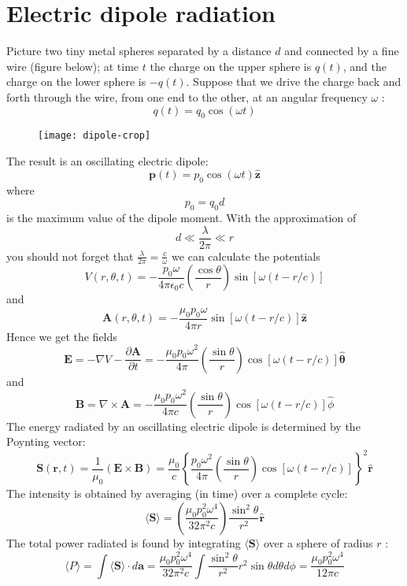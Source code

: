  \section{Electric dipole radiation}
 Picture two tiny metal spheres separated by a distance $d$ and connected by a fine wire (figure below); at time $t$ the charge on the upper sphere is $q(t)$, and the charge on the lower sphere is $-q(t)$. Suppose that we drive the charge back and forth through the wire, from one end to the other, at an angular frequency $\omega$ :
 $$
 q(t)=q_{0} \cos (\omega t)
 $$
 \begin{figure}[H]
 	\centering
 	\texttt{[image: dipole-crop]}
 	\caption{}
 	\label{}
 \end{figure}
 The result is an oscillating electric dipole:
 $$
 \mathbf{p}(t)=p_{0} \cos (\omega t) \hat{\mathbf{z}}
 $$
 where
 $$
 p_{0}=q_{0} d
 $$
 is the maximum value of the dipole moment.
 With the approximation of
 $$
 d \ll \frac{\lambda}{2 \pi} \ll r
 $$
 you should not forget that $\frac{\lambda}{2 \pi}=\frac{c}{\omega}$ we can calculate the potentials\\
 $$
 V(r, \theta, t)=-\frac{p_{0} \omega}{4 \pi \epsilon_{0} c}\left(\frac{\cos \theta}{r}\right) \sin [\omega(t-r / c)]
 $$
 and
 $$
 \mathbf{A}(r, \theta, t)=-\frac{\mu_{0} p_{0} \omega}{4 \pi r} \sin [\omega(t-r / c)] \hat{\mathbf{z}}
 $$
 Hence we get the fields
 $$
 \mathbf{E}=-\nabla V-\frac{\partial \mathbf{A}}{\partial t}=-\frac{\mu_{0} p_{0} \omega^{2}}{4 \pi}\left(\frac{\sin \theta}{r}\right) \cos [\omega(t-r / c)] \hat{\boldsymbol{\theta}}
 $$
 and
 $$
 \mathbf{B}=\nabla \times \mathbf{A}=-\frac{\mu_{0} p_{0} \omega^{2}}{4 \pi c}\left(\frac{\sin \theta}{r}\right) \cos [\omega(t-r / c)] \hat{\phi}
 $$
 The energy radiated by an oscillating electric dipole is determined by the Poynting vector:
 $$\mathbf{S}(\mathbf{r}, t)=\frac{1}{\mu_{0}}(\mathbf{E} \times \mathbf{B})=\frac{\mu_{0}}{c}\left\{\frac{p_{0} \omega^{2}}{4 \pi}\left(\frac{\sin \theta}{r}\right) \cos [\omega(t-r / c)]\right\}^{2} \hat{\mathbf{r}}$$
 The intensity is obtained by averaging (in time) over a complete cycle:
 $$\langle\mathbf{S}\rangle=\left(\frac{\mu_{0} p_{0}^{2} \omega^{4}}{32 \pi^{2} c}\right) \frac{\sin ^{2} \theta}{r^{2}} \hat{\mathbf{r}}$$
 The total power radiated is found by integrating $\langle\mathbf{S}\rangle$ over a sphere of radius $r$ :
 $$ \langle P\rangle=\int\langle\mathbf{S}\rangle \cdot d \mathbf{a}=\frac{\mu_{0} p_{0}^{2} \omega^{4}}{32 \pi^{2} c} \int \frac{\sin ^{2} \theta}{r^{2}} r^{2} \sin \theta d \theta d \phi=\frac{\mu_{0} p_{0}^{2} \omega^{4}}{12 \pi c}$$
